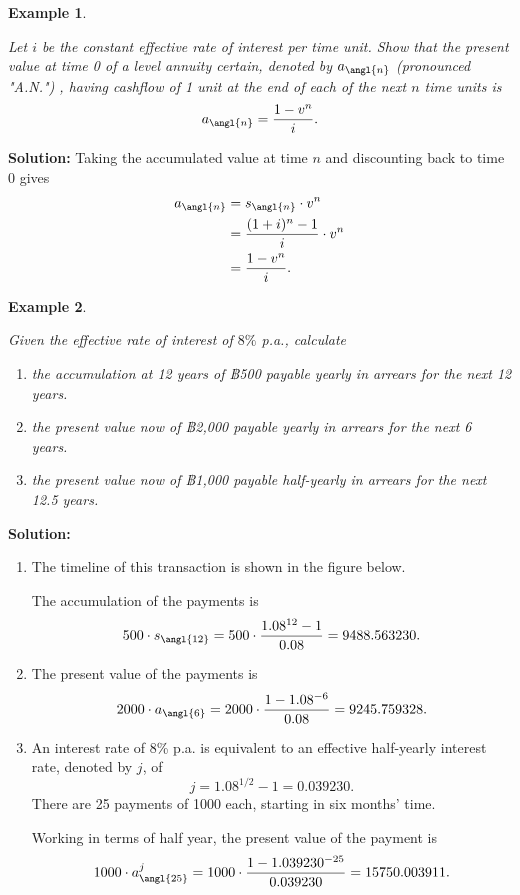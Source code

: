 \documentclass[landscape, 20pt]{extreport}
\theoremstyle{definition}
\theoremstyle{definition}
\newtheorem{example}{Example}[chapter]
\theoremstyle{definition}
\theoremstyle{definition}
\theoremstyle{remark}
\begin{document}
\newpage \begin{example}
\protect\hypertarget{exm:unlabeled-div-19}{}\label{exm:unlabeled-div-19}

\emph{Let \(i\) be the constant effective rate of interest
per time unit. Show that the present value at time 0 of a level annuity
certain, denoted by \(a_\angl{n}\) (pronounced "A.N.") , having cashflow
of 1 unit at the end of each of the next \(n\) time units is
\[a_\angl{n} = \frac{1 - v^n }{i}.\]}

\end{example}

\textbf{Solution:} Taking the accumulated value at time \(n\) and discounting
back to time 0 gives \[\begin{aligned}
    a_\angl{n} &= s_\angl{n} \cdot v^n \\
            &= \frac{(1+i)^{n} - 1}{i} \cdot v^n \\
            &=  \frac{1 - v^n }{i}.\end{aligned}\]

\newpage \begin{example}
\protect\hypertarget{exm:unlabeled-div-20}{}\label{exm:unlabeled-div-20}

\emph{Given the effective rate of interest of \(8\%\) p.a.,
calculate}

\begin{enumerate}
\def\labelenumi{\arabic{enumi}.}
\item
  \emph{the accumulation at 12 years of ฿500 payable yearly in arrears for
  the next 12 years.}
\item
  \emph{the present value now of ฿2,000 payable yearly in arrears for the
  next 6 years.}
\item
  \emph{the present value now of ฿1,000 payable half-yearly in arrears for
  the next 12.5 years.}
\end{enumerate}

\end{example}

\textbf{Solution:}

\begin{enumerate}
\def\labelenumi{\arabic{enumi}.}
\item
  The timeline of this transaction is shown in the figure below.

  The accumulation of the payments is
  \[500 \cdot s_\angl{12}  = 500 \cdot \frac{1.08^{12} - 1 }{0.08 } = 9488.563230.\]
\item
  The present value of the payments is
  \[2000\cdot a_\angl{6}  = 2000 \cdot \frac{1 - 1.08^{-6} }{0.08 } = 9245.759328.\]
\item
  An interest rate of 8\% p.a. is equivalent to an effective
  half-yearly interest rate, denoted by \(j\), of
  \[j = 1.08^{1/2} -1 = 0.039230.\] There are 25 payments of 1000
  each, starting in six months' time.

  Working in terms of half year, the present value of the payment is
  \[1000 \cdot a^j_\angl{25} = 1000 \cdot \frac{1 - 1.039230^{-25} }{0.039230 } = 15750.003911.\]
\end{enumerate}
\end{document}
